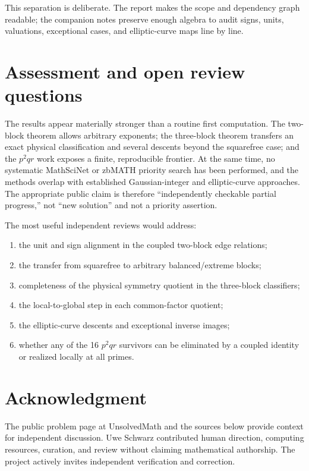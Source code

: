 \documentclass[11pt]{article}
\theoremstyle{definition}
\theoremstyle{remark}
\begin{document}
This separation is deliberate.  The report makes the scope and dependency
graph readable; the companion notes preserve enough algebra to audit signs,
units, valuations, exceptional cases, and elliptic-curve maps line by line.

\section{Assessment and open review questions}

The results appear materially stronger than a routine first computation.
The two-block theorem allows arbitrary exponents; the three-block theorem
transfers an exact physical classification and several descents beyond the
squarefree case; and the $p^2qr$ work exposes a finite, reproducible frontier.
At the same time, no systematic MathSciNet or zbMATH priority search has been
performed, and the methods overlap with established Gaussian-integer and
elliptic-curve approaches.  The appropriate public claim is therefore
``independently checkable partial progress,'' not ``new solution'' and not a
priority assertion.

The most useful independent reviews would address:
\begin{enumerate}[leftmargin=2em]
  \item the unit and sign alignment in the coupled two-block edge relations;
  \item the transfer from squarefree to arbitrary balanced/extreme blocks;
  \item completeness of the physical symmetry quotient in the three-block
        classifiers;
  \item the local-to-global step in each common-factor quotient;
  \item the elliptic-curve descents and exceptional inverse images;
  \item whether any of the 16 $p^2qr$ survivors can be eliminated by a coupled
        identity or realized locally at all primes.
\end{enumerate}

\section*{Acknowledgment}

The public problem page at UnsolvedMath and the sources below provide context
for independent discussion.  Uwe Schwarz contributed human direction,
computing resources, curation, and review without claiming mathematical
authorship.  The project actively invites independent verification and
correction.
\end{document}

